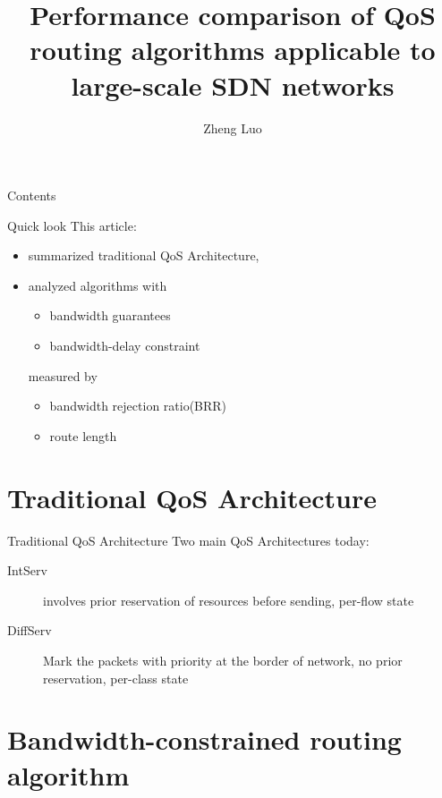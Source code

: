 \documentclass{beamer}
\title{Performance comparison of QoS routing algorithms
applicable to large-scale SDN networks }
\author{Zheng Luo}
\begin{document}
\begin{frame}
  \titlepage
\end{frame}

\begin{frame}{Contents}
\begin{multicols}{2}
        \tableofcontents
\end{multicols}

\end{frame}


\begin{frame} {Quick look}   
This article:
\begin{itemize}
    \item summarized traditional QoS Architecture,
    \item analyzed algorithms with
            \begin{itemize}
                \item bandwidth guarantees
                \item bandwidth-delay constraint
            \end{itemize}
        measured by
            \begin{itemize}
                \item bandwidth rejection ratio(BRR)
                \item route length
            \end{itemize}
\end{itemize} 
\end{frame}

\section{Traditional QoS Architecture}
\begin{frame}{Traditional QoS Architecture}
Two main QoS Architectures today:
\begin{description}
    \item[IntServ] involves prior reservation of resources before sending, per-flow state
    \item[DiffServ] Mark the packets with priority at the border of network, no prior reservation, per-class state
\end{description}
\end{frame}

\section{Bandwidth-constrained routing algorithm}
\end{document}
